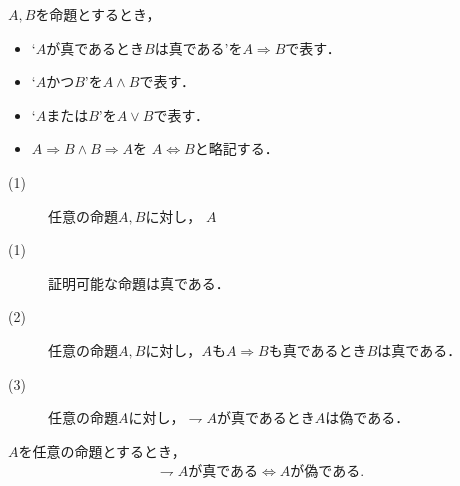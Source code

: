 	\begin{screen}
		\begin{dfn}
			$A,B$を命題とするとき，
			\begin{itemize}
				\item `$A$が真であるとき$B$は真である'を$A \Longrightarrow B$で表す．
				\item `$A$かつ$B$'を$A \wedge B$で表す．
				\item `$A$または$B$'を$A \vee B$で表す．
				\item $A \Longrightarrow B \wedge B \Longrightarrow A$を
					$A \Longleftrightarrow B$と略記する．
			\end{itemize}
		\end{dfn}
	\end{screen}
	
	\begin{screen}
		\begin{axm}[命題論理の公理]\mbox{}
			\begin{description}
				\item[(1)] 任意の命題$A,B$に対し，
					$A $
				\item[(1)] 証明可能な命題は真である．
				\item[(2)] 任意の命題$A,B$に対し，$A$も$A \Longrightarrow B$も真であるとき$B$は真である．
				\item[(3)] 任意の命題$A$に対し，$\rightharpoondown A$が真であるとき$A$は偽である．
			\end{description}
		\end{axm}
	\end{screen}
	
	\begin{screen}
		\begin{thm}
			$A$を任意の命題とするとき，
			\begin{align}
				\mbox{$\rightharpoondown A$が真である} \Longleftrightarrow \mbox{$A$が偽である}.
			\end{align}
		\end{thm}
	\end{screen}